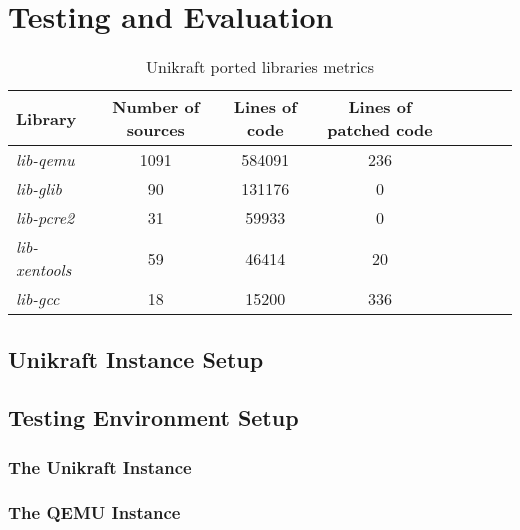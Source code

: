 \chapter{Testing and Evaluation}
\label{chapter:testing-evaluation}

\begin{center}
\begin{table}[htb]
  \caption{Unikraft ported libraries metrics}
  \begin{tabular}{l*{6}{c}r}
    Library & Number of sources & Lines of code & Lines of patched code \\
    \hline
    \textit{lib-qemu} & 1091 & 584091 & 236  \\
    \textit{lib-glib} & 90 & 131176 & 0  \\
    \textit{lib-pcre2} & 31 & 59933 & 0 \\
    \textit{lib-xentools} & 59 & 46414 & 20 \\
    \textit{lib-gcc} & 18 & 15200 & 336 \\
  \end{tabular}
  \label{table:reports}
\end{table}
\end{center}


\section{Unikraft Instance Setup}
\label{sec:unikraft-instance-setup}

\section{Testing Environment Setup}
\label{sec:testing-environment-setup}

\subsection{The Unikraft Instance}
\label{subsec:testing-environment-setup}

\subsection{The QEMU Instance}
\label{subsec:qemu-instance}


